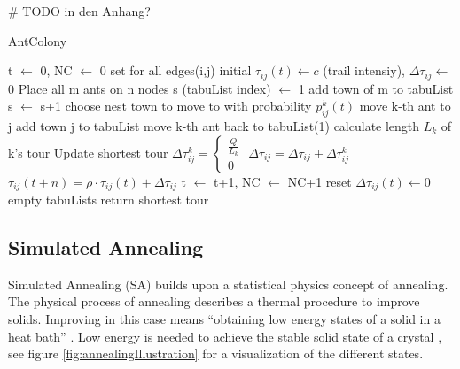\# TODO in den Anhang?
\begin{breakablealgorithm}
	\caption{AntColony}
	\label{alg:AntColony}
	\begin{algorithmic}[1]
		\STATE t $\gets$ 0,  NC $\gets$ 0
		\STATE set for all edges(i,j) initial $\tau_{ij}(t) \gets c$ (trail intensiy), $\Delta \tau_{ij} \gets$ 0 
		\STATE Place all m ants on n nodes
		\STATE s (tabuList index) $\gets$ 1
			\STATE add town of m to tabuList
				\STATE s $\gets$ s+1
					\STATE choose nest town to move to with probability $p_{ij}^k(t)$
					\STATE move k-th ant to j
					\STATE add town j to tabuList
				\ENDFOR
			\ENDWHILE
				\STATE move k-th ant back to tabuList(1)
				\STATE calculate length $L_k$ of k's tour
				\STATE Update shortest tour
						\STATE $\Delta\tau_{ij}^k = \begin{cases}
							\frac{Q}{L_k}\\
							0
						\end{cases}$
						\STATE $\Delta\tau_{ij} = \Delta\tau_{ij} + \Delta\tau_{ij}^k$
					\ENDFOR
				\ENDFOR
			\ENDFOR
				\STATE $\tau_{ij}(t+n)=\rho \cdot \tau_{ij}(t) + \Delta\tau_{ij}$
			\ENDFOR
			\STATE t $\gets$ t+1, NC $\gets$ NC+1
				\STATE reset $\Delta\tau_{ij}(t) \gets 0$
			\ENDFOR
				\STATE empty tabuLists
			\ELSE
				\STATE return shortest tour
			\ENDIF
		\ENDFOR
	\end{algorithmic}	
\end{breakablealgorithm}

\subsection{Simulated Annealing}
\label{subsec:simulatedAnnealingBackground}

Simulated Annealing (SA) builds upon a statistical physics concept of annealing.
The physical process of annealing describes a thermal procedure to improve solids.
Improving in this case means \enquote{obtaining low energy states of a solid in a heat bath} \cite{aarts_simulated_2005}.
Low energy is needed to achieve the stable solid state of a crystal \cite{delahaye_simulated_2019}, see figure \ref{fig:annealingIllustration} for a visualization of the different states.

